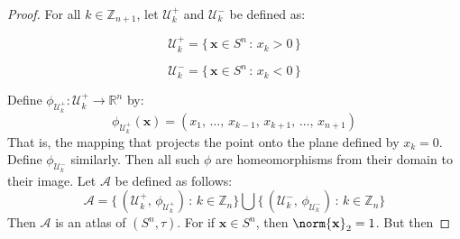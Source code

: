 \documentclass[oneside]{book}                                                  %
\begin{document}
            \begin{proof}
                For all $k\in\mathbb{Z}_{n+1}$, let $\mathcal{U}_{k}^{+}$ and
                $\mathcal{U}_{k}^{\minus}$ be defined as:
                \par\hfill\par
                \begin{minipage}[b]{0.49\textwidth}
                    \begin{equation}
                        \mathcal{U}_{k}^{+}
                        =\{\,\mathbf{x}\in{S}^{n}\,:\,x_{k}>0\,\}
                    \end{equation}
                \end{minipage}
                \hfill
                \begin{minipage}[b]{0.49\textwidth}
                    \begin{equation}
                        \mathcal{U}_{k}^{\minus}
                        =\{\,\mathbf{x}\in{S}^{n}\,:\,x_{k}<0\,\}
                    \end{equation}
                \end{minipage}
                \par\vspace{2.5ex}
                Define $\phi_{\mathcal{U}_{k}^{+}}:\mathcal{U}_{k}^{+}%
                        \rightarrow\mathbb{R}^{n}$ by:
                \begin{equation}
                    \phi_{\mathcal{U}_{k}^{+}}(\mathbf{x})
                    =(x_{1},\,\dots,\,x_{k-1},\,x_{k+1},\,\dots,\,x_{n+1})
                \end{equation}
                That is, the mapping that projects the point onto the plane
                defined by $x_{k}=0$. Define $\phi_{\mathcal{U}_{k}^{\minus}}$
                similarly. Then all such $\phi$ are homeomorphisms from their
                domain to their image. Let $\mathcal{A}$ be defined as follows:
                \begin{equation}
                    \mathcal{A}
                    =\big\{\,(\mathcal{U}_{k}^{+},\,\phi_{\mathcal{U}_{k}^{+}})
                           \,:\,k\in\mathbb{Z}_{n}\big\}\bigcup
                    \big\{\,(\mathcal{U}_{k}^{-},\,\phi_{\mathcal{U}_{k}^{-}})
                           \,:\,k\in\mathbb{Z}_{n}\big\}
                \end{equation}
                Then $\mathcal{A}$ is an atlas of $(S^{n},\tau)$. For if
                $\mathbf{x}\in{S}^{n}$, then $\norm{\mathbf{x}}_{2}=1$. But then

\end{proof}
\end{document}
